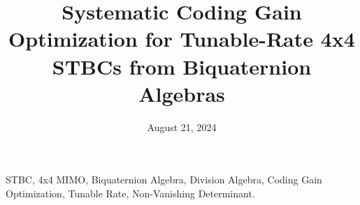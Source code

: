 \documentclass[twocolumn,conference]{IEEEtran}
\title{Systematic Coding Gain Optimization for Tunable-Rate 4x4 STBCs from Biquaternion Algebras}
\author{
    \IEEEauthorblockN{Ilias Chrysovergis}
}
\date{August 21, 2024}
\begin{document}
\maketitle



\begin{IEEEkeywords}
STBC, 4x4 MIMO, Biquaternion Algebra, Division Algebra, Coding Gain Optimization, Tunable Rate, Non-Vanishing Determinant.
\end{IEEEkeywords}












\end{document}
